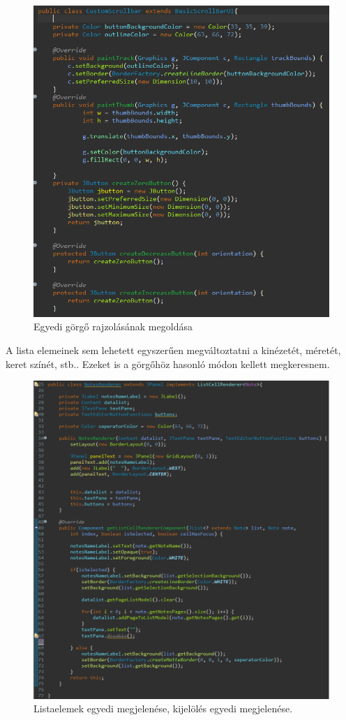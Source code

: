 \begin{figure}[h]
	\centering
	\includegraphics[scale=0.4]{images/code_1.png}
	\caption{Egyedi görgő rajzolásának megoldása}
	\label{fig:code_scrollbar}
\end{figure}
\vspace{5pt}\noindent A lista elemeinek sem lehetett egyszerűen megváltoztatni a kinézetét, méretét, keret színét, stb.. Ezeket is a görgőhöz hasonló módon kellett megkeresnem.
\begin{figure}[h]
	\centering
	\includegraphics[scale=0.3]{images/code_2.png}
	\caption{Listaelemek egyedi megjelenése, kijelölés egyedi megjelenése.}
	\label{fig:code_list_item}
\end{figure}
